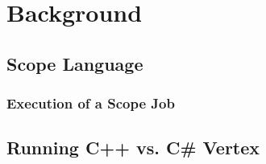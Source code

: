 \section{Background}

\subsection{Scope Language}

\subsubsection{Execution of a Scope Job}

\subsection{Running C++ vs. C\# Vertex}

